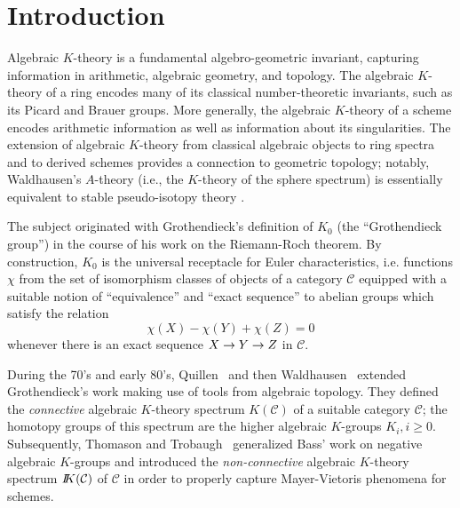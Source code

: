 \documentclass{amsart}
\renewcommand{\to}{\mathchoice{\longrightarrow}{\rightarrow}{\rightarrow}{\rightarrow}}
\let\catsymbfont\mathcal
\newcommand{\aC}{{\catsymbfont{C}}}
\newcommand{\C}{\catsymbfont{C}}
\newcommand{\bbK}{I\mspace{-6.mu}K}
\numberwithin{equation}{section}
\theoremstyle{definition}
\begin{document}
\maketitle
\setcounter{tocdepth}{2}
\tableofcontents

\section{Introduction}


Algebraic $K$-theory is a fundamental algebro-geometric invariant,
capturing information in arithmetic, algebraic geometry, and topology.
The algebraic $K$-theory of a ring encodes many of its classical
number-theoretic invariants, such as its Picard and Brauer groups.
More generally, the algebraic $K$-theory of a scheme encodes
arithmetic information as well as information about its singularities.
The extension of algebraic $K$-theory from classical algebraic objects
to ring spectra and to derived schemes provides a connection to
geometric topology; notably, Waldhausen's $A$-theory (i.e., the
$K$-theory of the sphere spectrum) is essentially equivalent to stable
pseudo-isotopy theory \cite{WaldA2}.

The subject originated with Grothendieck's definition of $K_0$ (the
``Grothendieck group'') in the course of his work on the Riemann-Roch
theorem.  By construction, $K_0$ is the universal receptacle for Euler
characteristics, i.e. functions $\chi$ from the set of isomorphism classes of objects of a category $\C$ equipped with a suitable notion of ``equivalence'' and ``exact sequence'' to abelian groups which satisfy the relation
\[
\chi(X) - \chi(Y) + \chi(Z) = 0
\]
whenever there is an exact sequence $X\to Y\to Z$ in $\C$.

During the 70's and early 80's, Quillen~\cite{Quillen} and then
Waldhausen~\cite{Wald} extended Grothendieck's work making use of
tools from algebraic topology.  They defined the {\em connective}
algebraic $K$-theory spectrum $K(\aC)$ of a suitable category $\aC$; the homotopy
groups of this spectrum are the higher algebraic $K$-groups $K_i,
i \geq 0$.  Subsequently, Thomason and Trobaugh~\cite{TT} generalized
Bass' work \cite{Bass} on negative algebraic $K$-groups and introduced
the {\em non-connective} algebraic $K$-theory spectrum $\bbK(\aC)$ of $\aC$ in order to 
properly capture Mayer-Vietoris phenomena for schemes.
\end{document}
